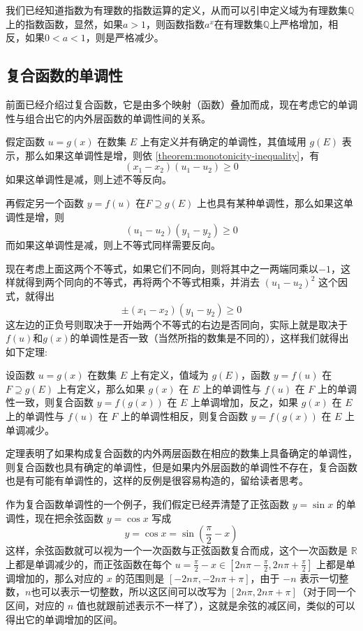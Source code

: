 \begin{example}
  我们已经知道指数为有理数的指数运算的定义，从而可以引申定义域为有理数集$\mathbb{Q}$上的指数函数，显然，如果$a>1$，则函数指数$a^x$在有理数集$\mathbb{Q}$上严格增加，相反，如果$0<a<1$，则是严格减少。
\end{example}

\subsection{复合函数的单调性}
\label{sec:montonicity-of-combine-function}

前面已经介绍过复合函数，它是由多个映射（函数）叠加而成，现在考虑它的单调性与组合出它的内外层函数的单调性间的关系。

假定函数 $u=g(x)$ 在数集 $E$ 上有定义并有确定的单调性，其值域用 $g(E)$ 表示，那么如果这单调性是增，则依 \autoref{theorem:monotonicity-inequality}，有
\[ (x_1-x_2)(u_1-u_2) \geqslant 0 \]
如果这单调性是减，则上述不等反向。

再假定另一个函数 $y=f(u)$ 在$F \supseteq g(E)$ 上也具有某种单调性，那么如果这单调性是增，则
\[ (u_1-u_2)(y_1-y_2) \geqslant 0 \]
而如果这单调性是减，则上不等式同样需要反向。

现在考虑上面这两个不等式，如果它们不同向，则将其中之一两端同乘以$-1$，这样就得到两个同向的不等式，再将两个不等式相乘，并消去 $(u_1-u_2)^2$ 这个因式，就得出
\[ \pm (x_1-x_2)(y_1-y_2) \geqslant 0 \]
这左边的正负号则取决于一开始两个不等式的右边是否同向，实际上就是取决于$f(u)$和$g(x)$的单调性是否一致（当然所指的数集是不同的），这样我们就得出如下定理:

\begin{theorem}
  设函数 $u=g(x)$ 在数集 $E$ 上有定义，值域为 $g(E)$，函数 $y=f(u)$ 在 $F \supseteq g(E)$ 上有定义，那么如果 $g(x)$ 在 $E$ 上的单调性与 $f(u)$ 在 $F$ 上的单调性一致，则复合函数 $y=f(g(x))$ 在 $E$ 上单调增加，反之，如果 $g(x)$ 在 $E$ 上的单调性与 $f(u)$ 在 $F$ 上的单调性相反，则复合函数 $y=f(g(x))$ 在 $E$ 上单调减少。
\end{theorem}

定理表明了如果构成复合函数的内外两层函数在相应的数集上具备确定的单调性，则复合函数也具有确定的单调性，但是如果内外层函数的单调性不存在，复合函数也是有可能有单调性的，这样的反例是很容易构造的，留给读者思考。

\begin{example}
  作为复合函数单调性的一个例子，我们假定已经弄清楚了正弦函数 $y=\sin{x}$ 的单调性，现在把余弦函数 $y=\cos{x}$ 写成
  \[ y = \cos{x} = \sin{\left( \frac{\pi}{2} - x \right)} \]
  这样，余弦函数就可以视为一个一次函数与正弦函数复合而成，这个一次函数是 $\mathbb{R}$上都是单调减少的，而正弦函数在每个 $ u = \frac{\pi}{2} - x \in [ 2n\pi-\frac{\pi}{2}, 2n\pi+\frac{\pi}{2} ]$ 上都是单调增加的，那么对应的 $x$ 的范围则是 $[-2n\pi, -2n\pi+\pi]$，由于 $-n$ 表示一切整数，$n$也可以表示一切整数，所以这区间可以改写为 $[2n\pi,2n\pi+\pi]$（对于同一个区间，对应的 $n$ 值也就跟前述表示不一样了），这就是余弦的减区间，类似的可以得出它的单调增加的区间。
\end{example}

